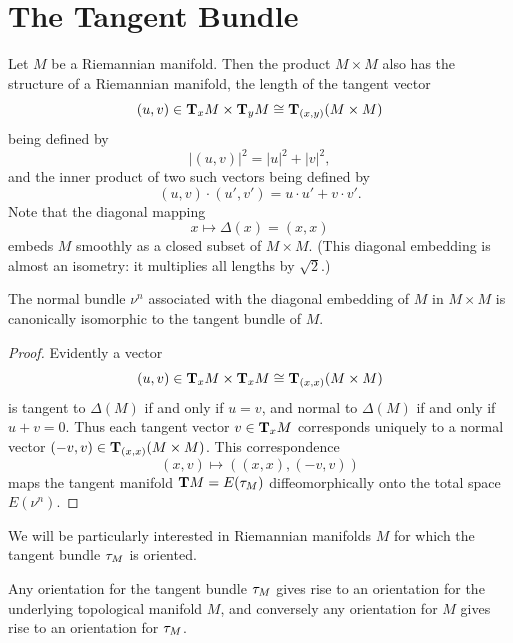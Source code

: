 \documentclass[../main]{subfiles}
\begin{document}
\section{The Tangent Bundle}
Let $M$ be a Riemannian manifold. Then the product $M \times M$ also has the structure of a Riemannian manifold, the length of the tangent vector \[(u, v) \in \tangentspace M x \times \tangentspace M y \cong \tangentspace {(M \times M)} {(x, y)}\] being defined by \[|(u, v)|^2 = |u|^2 + |v|^2,\] and the inner product of two such vectors being defined by \[(u, v) \cdot (u', v') = u \cdot u' + v \cdot v'.\] Note that the diagonal mapping \[x \mapsto \Delta(x) = (x, x)\] embeds $M$ smoothly as a closed subset of $M \times M$. (This diagonal embedding is almost an isometry: it multiplies all lengths by $\sqrt 2$.)

\begin{lemma}\label{lem:11.5}
The normal bundle $\nu^n$ associated with the diagonal embedding of $M$ in $M \times M$ is canonically isomorphic to the tangent bundle of $M$. 
\end{lemma}

\begin{proof}
Evidently a vector \[(u, v) \in \tangentspace M x \times \tangentspace M x \cong \tangentspace {(M \times M)} {(x, x)}\] is tangent to $\Delta(M)$ if and only if $u = v$, and normal to $\Delta(M)$ if and only if $u + v = 0$. Thus each tangent vector $v \in \tangentspace M x$ corresponds uniquely to a normal vector $(-v, v) \in \tangentspace {(M \times M)} {(x, x)}$. This correspondence \[(x, v) \mapsto ((x, x), (-v, v))\] maps the tangent manifold $\tangentTS M = E(\tangentbundle M)$ diffeomorphically onto the total space $E(\nu^n)$.
\end{proof}

We will be particularly interested in Riemannian manifolds $M$ for which the tangent bundle $\tangentbundle M$ is oriented. 

\begin{lemma}
\label{lem:11.6}
Any orientation for the tangent bundle $\tangentbundle M$ gives rise to an orientation for the underlying topological manifold $M$, and conversely any orientation for $M$ gives rise to an orientation for $\tangentbundle M$. 
\end{lemma}
\end{document}
